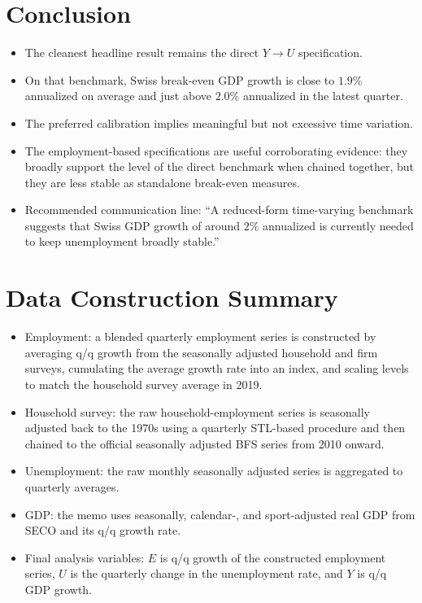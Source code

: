 \documentclass[11pt]{article}
\begin{document}
\section{Conclusion}
\begin{itemize}
    \item The cleanest headline result remains the direct \(Y \rightarrow U\) specification.
    \item On that benchmark, Swiss break-even GDP growth is close to \(1.9\%\) annualized on average and just above \(2.0\%\) annualized in the latest quarter.
    \item The preferred calibration implies meaningful but not excessive time variation.
    \item The employment-based specifications are useful corroborating evidence:
    they broadly support the level of the direct benchmark when chained together, but they are less stable as standalone break-even measures.
    \item Recommended communication line:
    ``A reduced-form time-varying benchmark suggests that Swiss GDP growth of around \(2\%\) annualized is currently needed to keep unemployment broadly stable.'' 
\end{itemize}

\appendix

\section{Data Construction Summary}
\begin{itemize}
    \item Employment:
    a blended quarterly employment series is constructed by averaging q/q growth from the seasonally adjusted household and firm surveys, cumulating the average growth rate into an index, and scaling levels to match the household survey average in 2019.
    \item Household survey:
    the raw household-employment series is seasonally adjusted back to the 1970s using a quarterly STL-based procedure and then chained to the official seasonally adjusted BFS series from 2010 onward.
    \item Unemployment:
    the raw monthly seasonally adjusted series is aggregated to quarterly averages.
    \item GDP:
    the memo uses seasonally, calendar-, and sport-adjusted real GDP from SECO and its q/q growth rate.
    \item Final analysis variables:
    \(E\) is q/q growth of the constructed employment series,
    \(U\) is the quarterly change in the unemployment rate,
    and \(Y\) is q/q GDP growth.
\end{itemize}
\end{document}
